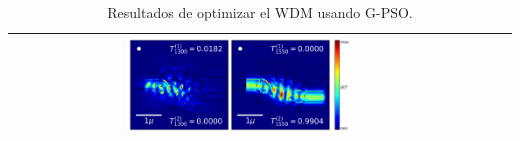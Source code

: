 \begin{landscape}
\begin{table}[ht]
\begin{tabular}{|c|c|c|c|}
      \includegraphics[width=0.50\textwidth]{image/results/wdm/PSO/visualize_field_disc_512.png} \\
    \hline
    \end{tabular}
    \hspace*{-5cm}
    \caption{Resultados de optimizar el WDM usando G-PSO.}
    \label{tab:opt-PSO-wdm}
\end{table}
\end{landscape}


